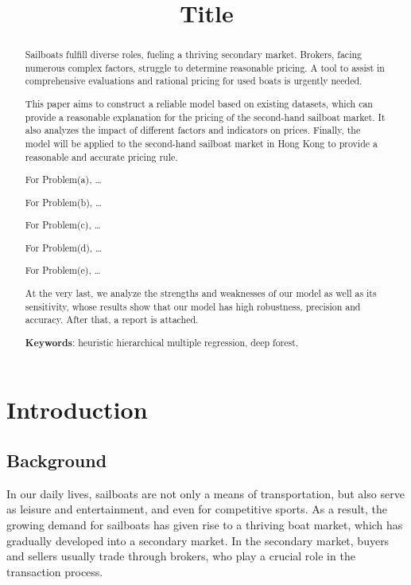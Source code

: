 \documentclass[12pt]{article}  %
\title{Title}  %
\begin{document}
\begin{abstract}
    Sailboats fulfill diverse roles, fueling a thriving secondary market. Brokers, facing numerous complex factors, struggle to determine reasonable pricing. A tool to assist in comprehensive evaluations and rational pricing for used boats is urgently needed.
    
    This paper aims to construct a reliable model based on existing datasets, which can provide a reasonable explanation for the pricing of the second-hand sailboat market. It also analyzes the impact of different factors and indicators on prices. Finally, the model will be applied to the second-hand sailboat market in Hong Kong to provide a reasonable and accurate pricing rule.

    For Problem(a), \dots

    For Problem(b), \dots

    For Problem(c), \dots

    For Problem(d), \dots

    For Problem(e), \dots

    At the very last, we analyze the strengths and weaknesses of our model as well as its
sensitivity, whose results show that our model has high robustness, precision and accuracy.
After that, a report is attached.




    \vspace{5pt}
    \textbf{Keywords}: heuristic hierarchical multiple regression, deep forest.

\end{abstract}

\maketitle  %
\tableofcontents  %


\section{Introduction}
\subsection{Background}
In our daily lives, sailboats are not only a means of transportation, but also serve as leisure and entertainment, and even for competitive sports. As a result, the growing demand for sailboats has given rise to a thriving boat market, which has gradually developed into a secondary market. In the secondary market, buyers and sellers usually trade through brokers, who play a crucial role in the transaction process.
\end{document}
